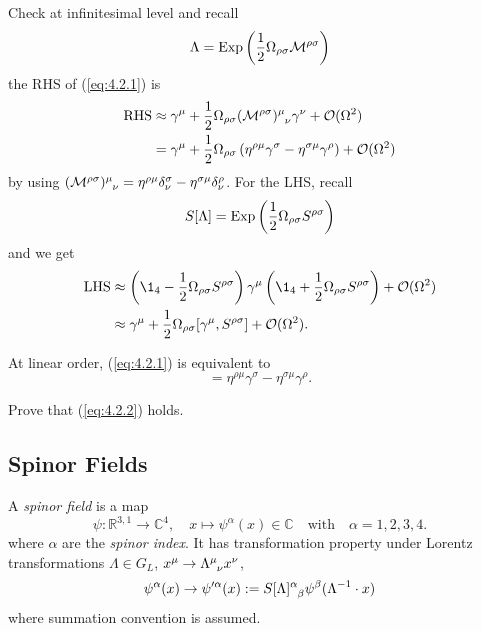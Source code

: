 \documentclass[a4paper,11pt]{article}
\begin{document}
	Check at infinitesimal level and recall
	\[
		\Lambda = \operatorname{Exp} \left( \frac{1}{2} \Omega _{\rho \sigma} \mathcal{M}^{\rho \sigma} \right)
	\]
	the RHS of (\ref{eq:4.2.1}) is 
	\begin{align*}
		\text{RHS} &\approx \gamma^\mu + \frac{1}{2} \Omega _{\rho \sigma} (\mathcal{M}^{\rho \sigma})\indices{^\mu _\nu} \gamma^\nu + \mathcal{O}(\Omega^2)\\
		& = \gamma^\mu + \frac{1}{2} \Omega _{\rho \sigma} \left( \eta ^{\rho \mu} \gamma^\sigma - \eta ^{\sigma \mu} \gamma^\rho \right) + \mathcal{O}(\Omega^2)
	\end{align*}
	by using $(\mathcal{M}^{\rho \sigma})\indices{^\mu_\nu} = \eta ^{\rho \mu}\delta^\sigma_\nu - \eta ^{\sigma \mu} \delta^\rho_\nu$. For the LHS, recall 
	\[
		S[\Lambda] = \operatorname{Exp} \left( \frac{1}{2} \Omega _{\rho \sigma} S ^{\rho \sigma} \right)
	\]
	and we get 
	\begin{align*}
		\text{LHS} & \approx \left( \1_4 - \frac{1}{2} \Omega _{\rho \sigma} S ^{\rho \sigma} \right) \gamma^\mu \left( \1_4 + \frac{1}{2} \Omega _{\rho \sigma} S ^{\rho \sigma} \right) + \mathcal{O}(\Omega^2)\\
		& \approx \gamma^\mu + \frac{1}{2} \Omega _{\rho \sigma} [\gamma^\mu, S ^{\rho \sigma}] + \mathcal{O}(\Omega^2).
	\end{align*}
	
	At linear order, (\ref{eq:4.2.1}) is equivalent to 
	\begin{equation}
		[\gamma^\mu , S ^{\rho \sigma}] = \eta ^{\rho \mu} \gamma^\sigma - \eta ^{\sigma \mu} \gamma^\rho.
		\label{eq:4.2.2}
	\end{equation}

	\begin{exer}
		Prove that (\ref{eq:4.2.2}) holds.
	\end{exer}

	\subsection{Spinor Fields}

	\begin{defi}
		A \emph{spinor field} is a map 
		\[
			\psi : \mathbb{R} ^{3,1} \to \mathbb{C}^4, \quad x \mapsto \psi^\alpha (x) \in \mathbb{C} \quad \text{with} \quad \alpha = 1,2,3,4.
		\]
		where $\alpha$ are the \emph{spinor index}. It has transformation property under Lorentz transformations $\Lambda \in G_L$, $x^\mu \to \LT{\mu}{\nu}x^\nu$, 
		\begin{equation}
			\psi^\alpha (x) \to \psi'^\alpha (x) := S[\Lambda]\indices{^\alpha_\beta} \psi^\beta(\Lambda^{-1} \cdot x)
			\label{eq:4.3.1}
		\end{equation}
		where summation convention is assumed. 
	\end{defi}
\end{document}
